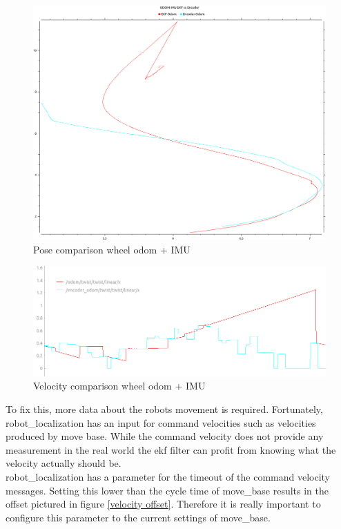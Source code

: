 \begin{figure}[H]
	\includegraphics[width=\textwidth]{Pictures/odom pose comp}
	\caption{Pose comparison wheel odom + IMU}
	\label{pose comparison wheel odom + IMU}

\end{figure}

\begin{figure}[H]
	\includegraphics[width=\textwidth]{Pictures/comparison odom}
	\caption{Velocity comparison wheel odom + IMU}
	\label{velocity comparison wheel odom + IMU}

\end{figure}


To fix this, more data about the robots movement is required. Fortunately, robot\_localization has an input for command velocities such as velocities produced by move base. While the command velocity does not provide any measurement in the real world the ekf filter can profit from knowing what the velocity actually should be.\\

robot\_localization has a parameter for the timeout of the command velocity messages. Setting this lower than the cycle time of move\_base results in the offset pictured in figure \ref{velocity offset}. Therefore it is really important to configure this parameter to the current settings of move\_base.

